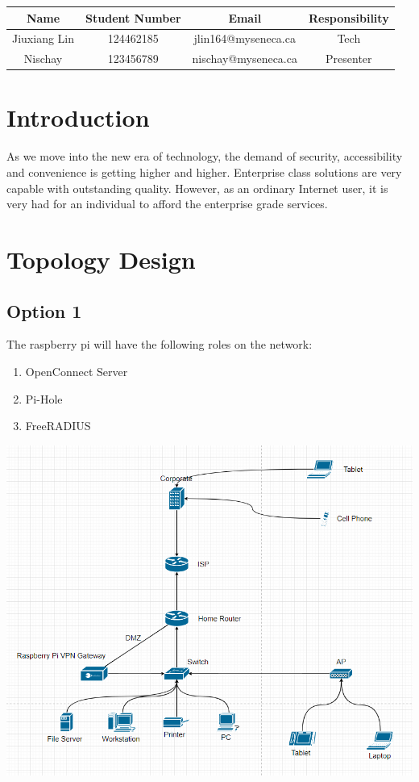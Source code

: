 \documentclass[12pt]{article}
\begin{document}
\begin{tabular}{| c | c | c | c |}
\hline
\textbf{Name} & \textbf{Student Number} & \textbf{Email} & \textbf{Responsibility} \\\hline
Jiuxiang Lin & 124462185 & jlin164@myseneca.ca & Tech \\\hline
Nischay & 123456789 & nischay@myseneca.ca & Presenter \\\hline
\end{tabular}

\section{Introduction}

As we move into the new era of technology, the demand of security, accessibility and convenience is getting higher and higher. Enterprise class solutions are very capable with outstanding quality. However, as an ordinary Internet user, it is very had for an individual to afford the enterprise grade services.

\vfill

\section{Topology Design}

\subsection{Option 1}

The raspberry pi will have the following roles on the network:

\begin{enumerate}
\item OpenConnect Server
\item Pi-Hole
\item FreeRADIUS
\end{enumerate}

\begin{center}
\includegraphics[scale=0.6]{topology.png}\\[1cm]
\end{center}
\end{document}
